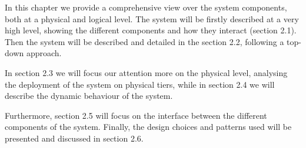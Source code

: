 In this chapter we provide a comprehensive view over the system components, both at a physical and logical level.
The system will be firstly described at a very high level, showing the different components and how they interact (section 2.1).
Then the system will be described and detailed in the section 2.2, following a top-down approach.

In section 2.3 we will focus our attention more on the physical level, analysing the deployment of the system on physical tiers, while in section 2.4 we will describe the dynamic behaviour of the system.

Furthermore, section 2.5 will focus on the interface between the different components of the system.
Finally, the design choices and patterns used will be presented and discussed in section 2.6.
